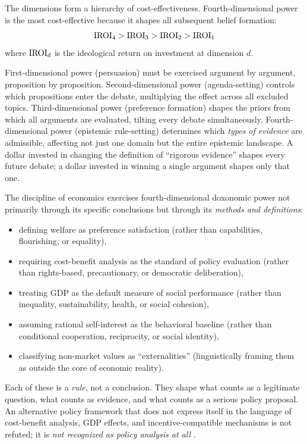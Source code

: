 \begin{proposition}
\label{prop:power-ordering}
The dimensions form a hierarchy of cost-effectiveness.
Fourth-dimensional power is the most cost-effective because it shapes all subsequent belief formation:
\[
  \mathrm{IROI}_4 > \mathrm{IROI}_3 > \mathrm{IROI}_2 > \mathrm{IROI}_1
\]
where $\mathrm{IROI}_d$ is the ideological return on investment at dimension $d$.
\end{proposition}

\begin{remark}
\label{rem:ordering}
First-dimensional power (persuasion) must be exercised argument by argument, proposition by proposition.
Second-dimensional power (agenda-setting) controls which propositions enter the debate, multiplying the effect across all excluded topics.
Third-dimensional power (preference formation) shapes the priors from which all arguments are evaluated, tilting every debate simultaneously.
Fourth-dimensional power (epistemic rule-setting) determines which \emph{types of evidence} are admissible, affecting not just one domain but the entire epistemic landscape.
A dollar invested in changing the definition of ``rigorous evidence'' shapes every future debate; a dollar invested in winning a single argument shapes only that one.
\end{remark}

\begin{example}
\label{ex:econ-rules}
The discipline of economics exercises fourth-dimensional doxonomic power not primarily through its specific conclusions but through its \emph{methods and definitions}:
\begin{itemize}[nosep]
  \item defining welfare as preference satisfaction (rather than capabilities, flourishing, or equality),
  \item requiring cost-benefit analysis as the standard of policy evaluation (rather than rights-based, precautionary, or democratic deliberation),
  \item treating GDP as the default measure of social performance (rather than inequality, sustainability, health, or social cohesion),
  \item assuming rational self-interest as the behavioral baseline (rather than conditional cooperation, reciprocity, or social identity),
  \item classifying non-market values as ``externalities'' (linguistically framing them as outside the core of economic reality).
\end{itemize}
Each of these is a \emph{rule}, not a conclusion.
They shape what counts as a legitimate question, what counts as evidence, and what counts as a serious policy proposal.
An alternative policy framework that does not express itself in the language of cost-benefit analysis, GDP effects, and incentive-compatible mechanisms is not refuted; it is \emph{not recognized as policy analysis at all} \autocite{mirowski2009}.
\end{example}


